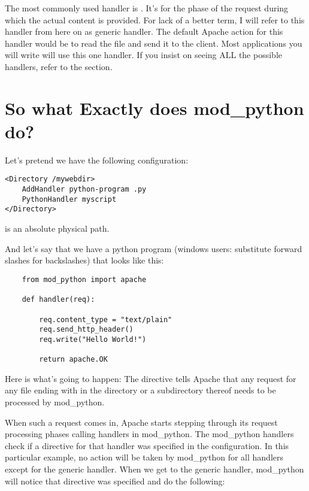 The most commonly used handler is . It's for the phase of
the request during which the actual content is provided. For lack of a
better term, I will refer to this handler from here on as generic
handler. The default Apache action for this handler would be to read
the file and send it to the client. Most applications you will write
will use this one handler. If you insist on seeing ALL the possible
handlers, refer to the  section.

\section{So what Exactly does mod_python do?\label{tut-what-it-do}}

Let's pretend we have the following configuration: 
\begin{verbatim}
<Directory /mywebdir>
    AddHandler python-program .py
    PythonHandler myscript
</Directory>
\end{verbatim}

  is an absolute physical path. 

And let's say that we have a python program (windows users: substitute
forward slashes for backslashes)  that looks like
this:

\begin{verbatim}
    from mod_python import apache

    def handler(req):

        req.content_type = "text/plain"
        req.send_http_header()
        req.write("Hello World!")

        return apache.OK
\end{verbatim}    

Here is what's going to happen: The  directive tells
Apache that any request for any file ending with  in the
 directory or a subdirectory thereof needs to be
processed by mod_python.

When such a request comes in, Apache starts stepping through its
request processing phases calling handlers in mod_python. The
mod_python handlers check if a directive for that handler was
specified in the configuration. In this particular example, no action
will be taken by mod_python for all handlers except for the generic
handler. When we get to the generic handler, mod_python will notice
that  directive was specified and do the
following:

